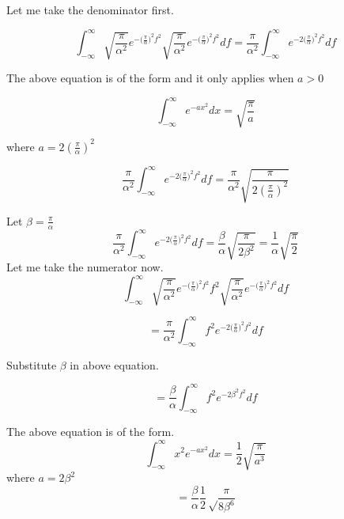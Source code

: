 Let me take the denominator first.


\begin{equation*}
\int_{-\infty}^{\infty}{\sqrt{\frac{\pi}{\alpha ^2}} e^{-{(\frac{\pi} {\alpha}})^2 f^2}  \sqrt{\frac{\pi}{\alpha ^2}} e^{-{(\frac{\pi} {\alpha}})^2 f^2} df} = \frac{\pi}{\alpha ^2} \int_{-\infty}^{\infty}{ e^{-2{(\frac{\pi} {\alpha}})^2 f^2}df}
\end{equation*}



The above equation is of the form and it only applies when $a > 0$

\begin{equation*}
\int_{-\infty}^{\infty}e^{-ax^2 }dx = \sqrt{\frac{\pi}{a}}
\end{equation*}

where $a = 2(\frac{\pi}{\alpha})^ 2$

\begin{equation*}
\frac{\pi}{\alpha ^2} \int_{-\infty}^{\infty}{ e^{-2{(\frac{\pi} {\alpha}})^2 f^2}df} = \frac{\pi}{\alpha ^2} \sqrt{\frac{\pi}{2(\frac{\pi}{\alpha})^ 2}}
\end{equation*}

Let $\beta = \frac{\pi}{\alpha}$
\begin{equation*}
\frac{\pi}{\alpha ^2} \int_{-\infty}^{\infty}{ e^{-2{(\frac{\pi} {\alpha}})^2 f^2}df} = \frac{\beta}{\alpha} \sqrt{\frac{\pi}{2 \beta^ 2}} = \frac{1}{\alpha} \sqrt{\frac{\pi}{2 }}
\end{equation*}
Let me take the numerator now.
\begin{equation*}
\int_{-\infty}^{\infty}{\sqrt{\frac{\pi}{\alpha ^2}} e^{-{(\frac{\pi} {\alpha}})^2 f^2} f^2  \sqrt{\frac{\pi}{\alpha ^2}} e^{-{(\frac{\pi} {\alpha}})^2 f^2} df}
\end{equation*}

\begin{equation*}
=\frac{\pi}{\alpha ^2}\int_{-\infty}^{\infty}{ f^2 e^{-2{(\frac{\pi} {\alpha}})^2 f^2}  df}
\end{equation*}

Substitute $\beta$ in above equation.

\begin{equation*}
=\frac{\beta}{\alpha }\int_{-\infty}^{\infty}{ f^2 e^{-2 \beta ^2 f^2}  df}
\end{equation*}


The above equation is of the form.
\begin{equation*}
\int_{-\infty}^{\infty}x^2 e^{- ax^2 }dx = \frac{1}{2}\sqrt{\frac{\pi}{a^3}}
\end{equation*}
where $a = 2\beta ^ 2$
\begin{equation*}
 = \frac{\beta}{\alpha}\frac{1}{2}\sqrt\frac{\pi}{8\beta ^6 }
\end{equation*}


